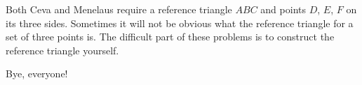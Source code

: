 Both Ceva and Menelaus require a reference triangle $ABC$ and points $D$, $E$, $F$ on its three sides. Sometimes it will not be obvious what the reference triangle for a set of three points is. The difficult part of these problems is to construct the reference triangle yourself.

















% 












Bye, everyone!

